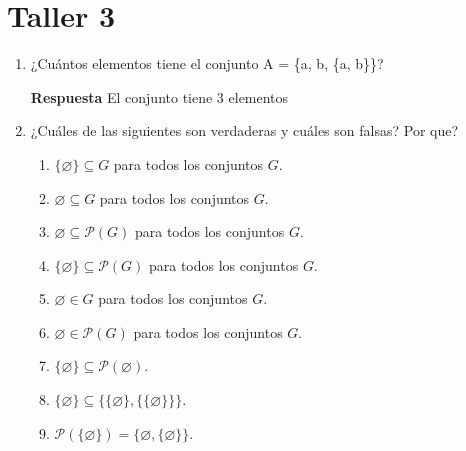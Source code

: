 \documentclass[12pt,letterpaper]{exam}
\begin{document}
\section*{Taller 3}

\begin{enumerate}
    \item ¿Cuántos elementos tiene el conjunto A = \{a, b, \{a, b\}\}?

        \textbf{Respuesta} El conjunto tiene 3 elementos 


    \item  ¿Cuáles de las siguientes son verdaderas y cuáles son falsas? Por que?
    \begin{enumerate}[label=\alph*)]
        \item $\{\varnothing\} \subseteq G$ para todos los conjuntos $G$.
        \item $\varnothing \subseteq G$ para todos los conjuntos $G$.
        \item $\varnothing \subseteq \mathcal{P}(G)$ para todos los conjuntos $G$.
        \item $\{\varnothing\} \subseteq \mathcal{P}(G)$ para todos los conjuntos $G$.
        \item $\varnothing \in G$ para todos los conjuntos $G$.
        \item $\varnothing \in \mathcal{P}(G)$ para todos los conjuntos $G$.
        \item $\{\varnothing\} \subseteq \mathcal{P}(\varnothing)$.
        \item $\{\varnothing\} \subseteq \{\{\varnothing\}, \{\{\varnothing\}\}\}$.
        \item $\mathcal{P}(\{\varnothing\}) = \{\varnothing, \{\varnothing\}\}$.
    \end{enumerate}


\end{enumerate}
\end{document}
